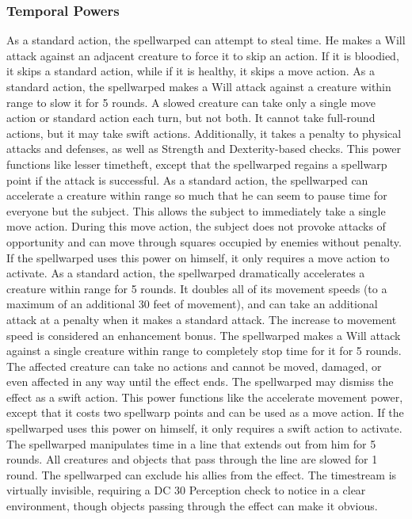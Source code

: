 \subsubsection{Temporal Powers}
 As a standard action, the spellwarped can attempt to steal time. He makes a Will attack against an adjacent creature to force it to skip an action. If it is bloodied, it skips a standard action, while if it is healthy, it skips a move action.
 As a standard action, the spellwarped makes a Will attack against a creature within \rngclose range to slow it for 5 rounds. A slowed creature can take only a single move action or standard action each turn, but not both. It cannot take full-round actions, but it may take swift actions. Additionally, it takes a  penalty to physical attacks and defenses, as well as Strength and Dexterity-based checks.
 This power functions like lesser timetheft, except that the spellwarped regains a spellwarp point if the attack is successful.
 As a standard action, the spellwarped can accelerate a creature within \rngclose range so much that he can seem to pause time for everyone but the subject. This allows the subject to immediately take a single move action. During this move action, the subject does not provoke attacks of opportunity and can move through squares occupied by enemies without penalty. If the spellwarped uses this power on himself, it only requires a move action to activate.
 As a standard action, the spellwarped dramatically accelerates a creature within \rngclose range for 5 rounds. It doubles all of its movement speeds (to a maximum of an additional 30 feet of movement), and can take an additional attack at a  penalty when it makes a standard attack. The increase to movement speed is considered an enhancement bonus.
 The spellwarped makes a Will attack against a single creature within \rngclose range to completely stop time for it for 5 rounds. The affected creature can take no actions and cannot be moved, damaged, or even affected in any way until the effect ends. The spellwarped may dismiss the effect as a swift action.
 This power functions like the accelerate movement power, except that it costs two spellwarp points and can be used as a move action. If the spellwarped uses this power on himself, it only requires a swift action to activate.
 The spellwarped manipulates time in a \arealarge line that extends out from him for 5 rounds. All creatures and objects that pass through the line are slowed for 1 round. The spellwarped can exclude his allies from the effect. The timestream is virtually invisible, requiring a DC 30 Perception check to notice in a clear environment, though objects passing through the effect can make it obvious.
